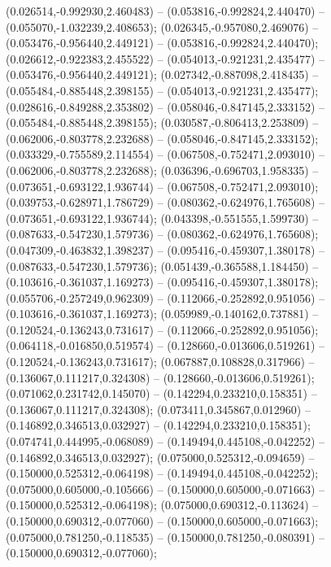  (0.026514,-0.992930,2.460483) -- (0.053816,-0.992824,2.440470) -- (0.055070,-1.032239,2.408653);
 (0.026345,-0.957080,2.469076) -- (0.053476,-0.956440,2.449121) -- (0.053816,-0.992824,2.440470);
 (0.026612,-0.922383,2.455522) -- (0.054013,-0.921231,2.435477) -- (0.053476,-0.956440,2.449121);
 (0.027342,-0.887098,2.418435) -- (0.055484,-0.885448,2.398155) -- (0.054013,-0.921231,2.435477);
 (0.028616,-0.849288,2.353802) -- (0.058046,-0.847145,2.333152) -- (0.055484,-0.885448,2.398155);
 (0.030587,-0.806413,2.253809) -- (0.062006,-0.803778,2.232688) -- (0.058046,-0.847145,2.333152);
 (0.033329,-0.755589,2.114554) -- (0.067508,-0.752471,2.093010) -- (0.062006,-0.803778,2.232688);
 (0.036396,-0.696703,1.958335) -- (0.073651,-0.693122,1.936744) -- (0.067508,-0.752471,2.093010);
 (0.039753,-0.628971,1.786729) -- (0.080362,-0.624976,1.765608) -- (0.073651,-0.693122,1.936744);
 (0.043398,-0.551555,1.599730) -- (0.087633,-0.547230,1.579736) -- (0.080362,-0.624976,1.765608);
 (0.047309,-0.463832,1.398237) -- (0.095416,-0.459307,1.380178) -- (0.087633,-0.547230,1.579736);
 (0.051439,-0.365588,1.184450) -- (0.103616,-0.361037,1.169273) -- (0.095416,-0.459307,1.380178);
 (0.055706,-0.257249,0.962309) -- (0.112066,-0.252892,0.951056) -- (0.103616,-0.361037,1.169273);
 (0.059989,-0.140162,0.737881) -- (0.120524,-0.136243,0.731617) -- (0.112066,-0.252892,0.951056);
 (0.064118,-0.016850,0.519574) -- (0.128660,-0.013606,0.519261) -- (0.120524,-0.136243,0.731617);
 (0.067887,0.108828,0.317966) -- (0.136067,0.111217,0.324308) -- (0.128660,-0.013606,0.519261);
 (0.071062,0.231742,0.145070) -- (0.142294,0.233210,0.158351) -- (0.136067,0.111217,0.324308);
 (0.073411,0.345867,0.012960) -- (0.146892,0.346513,0.032927) -- (0.142294,0.233210,0.158351);
 (0.074741,0.444995,-0.068089) -- (0.149494,0.445108,-0.042252) -- (0.146892,0.346513,0.032927);
 (0.075000,0.525312,-0.094659) -- (0.150000,0.525312,-0.064198) -- (0.149494,0.445108,-0.042252);
 (0.075000,0.605000,-0.105666) -- (0.150000,0.605000,-0.071663) -- (0.150000,0.525312,-0.064198);
 (0.075000,0.690312,-0.113624) -- (0.150000,0.690312,-0.077060) -- (0.150000,0.605000,-0.071663);
 (0.075000,0.781250,-0.118535) -- (0.150000,0.781250,-0.080391) -- (0.150000,0.690312,-0.077060);
